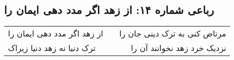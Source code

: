 \begin{center}
\section*{رباعی شماره ۱۴: از زهد اگر مدد دهی ایمان را}
\label{sec:sh014}
\begin{longtable}{l p{0.5cm} r}
از زهد اگر مدد دهی ایمان را
&&
مرتاض کنی به ترک دینی جان را
\\
ترک دنیا نه زهد دنیا زیراک
&&
نزدیک خرد زهد نخوانند آن را
\\
\end{longtable}
\end{center}
